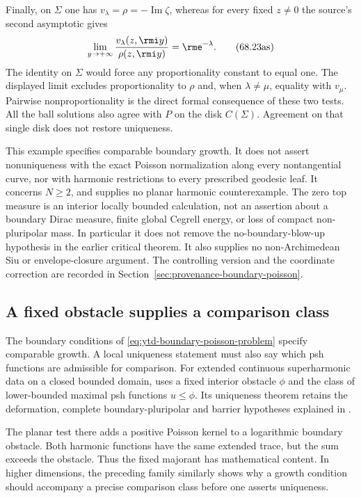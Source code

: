 Finally, on $\Sigma$ one has $v_\lambda=\rho=-\operatorname{Im}\zeta$,
whereas for every fixed $z\ne0$ the source's second asymptotic gives
\[
 \lim_{y\to+\infty}\frac{v_\lambda(z,\rmi y)}{\rho(z,\rmi y)}
                  =\rme^{-\lambda}.
\tag{68.23as}\label{eq:ytd-boundary-poisson-distinctness}
\]
The identity on $\Sigma$ would force any proportionality constant to
equal one. The displayed limit excludes proportionality to $\rho$ and,
when $\lambda\ne\mu$, equality with $v_\mu$. Pairwise
nonproportionality is the direct formal consequence of these two tests.
All the ball solutions also agree with $P$ on the disk $C(\Sigma)$.
Agreement on that single disk does not restore uniqueness.

This example specifies comparable boundary growth. It does not assert
nonuniqueness with the exact Poisson normalization along every
nontangential curve, nor with harmonic restrictions to every prescribed
geodesic leaf. It concerns $N\geq2$, and supplies no planar harmonic
counterexample. The zero top measure is an interior locally bounded
calculation, not an assertion about a boundary Dirac measure, finite
global Cegrell energy, or loss of compact non-pluripolar mass.
In particular it does not remove the no-boundary-blow-up hypothesis
in the earlier critical theorem. It also supplies no non-Archimedean
Siu or envelope-closure argument. The controlling version and the
coordinate correction are recorded in
Section~\ref{sec:provenance-boundary-poisson}.

\subsection{A fixed obstacle supplies a comparison class}
\label{sec:ytd-boundary-fixed-obstacle}

The boundary conditions of \eqref{eq:ytd-boundary-poisson-problem}
specify comparable growth. A local uniqueness statement must also say
which psh functions are admissible for comparison. For extended continuous
superharmonic data on a closed bounded domain,
\cite[Theorems~1.4 and~1.9]{DaoNguyen26UnboundedDirichletV1}
uses a fixed interior obstacle \(\phi\) and the class of lower-bounded
maximal psh functions \(u\leq\phi\). Its uniqueness theorem retains
the deformation, complete boundary-pluripolar and barrier hypotheses
explained in .

The planar test there adds a positive Poisson kernel to a logarithmic
boundary obstacle. Both harmonic functions have the same extended trace,
but the sum exceeds the obstacle. Thus the fixed majorant has mathematical
content. In higher dimensions, the preceding family similarly shows why
a growth condition should accompany a precise comparison class before
one asserts uniqueness.

